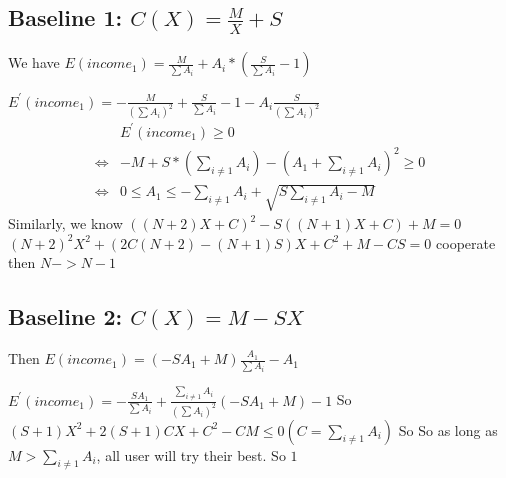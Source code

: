 \documentclass{article}
\begin{document}
\subsection{Baseline 1: $C(X)=\frac{M}{X}+S$}
We have $E(income_1)=\frac{M}{\sum A_i}+A_i*(\frac{S}{\sum A_i}-1)$
\par $E^{'}(income_1)= -\frac{M}{(\sum A_i)^2}+\frac{S}{\sum A_i}-1-A_i\frac{S}{(\sum A_i)^2}$
 \begin{equation}
\begin{aligned}
&E^{'}(income_1)\ge 0
\\\Longleftrightarrow&-M+S*(\sum_{i\ne 1}A_i)-(A_1+\sum_{i\ne 1}A_i)^2\ge 0
\\\Longleftrightarrow& 0 \le A_1 \le -\sum_{i\ne 1} A_i+\sqrt{S\sum_{i\ne 1} A_i-M}
\end{aligned}
\end{equation}
Similarly, we know 
$((N+2)X+C)^2-S((N+1)X+C)+M=0$
$(N+2)^2X^2+(2C(N+2)-(N+1)S)X+C^2+M-CS=0$
cooperate then
$N->N-1$
\subsection{Baseline 2: $C(X)=M-SX$}
\par Then $E(income_1)=(-SA_1+M)\frac{A_1}{\sum A_i}-A_1$ 
\par $E^{'}(income_1)=-\frac{SA_1}{\sum A_i}+\frac{\sum_{i\ne1}A_i}{(\sum A_i)^2}(-SA_1+M)-1$
So $(S+1)X^2+2(S+1)CX+C^2-CM\le 0(C=\sum_{i\ne 1}A_i)$
So
So as long as $M>\sum_{i\ne1} A_i$, all user will try their best.
So $1$
\end{document}
